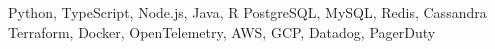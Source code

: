 \begin{cvskills}
   {Python, TypeScript, Node.js, Java, R}
   {PostgreSQL, MySQL, Redis, Cassandra}
   {Terraform, Docker, OpenTelemetry, AWS, GCP, Datadog, PagerDuty}
\end{cvskills}

